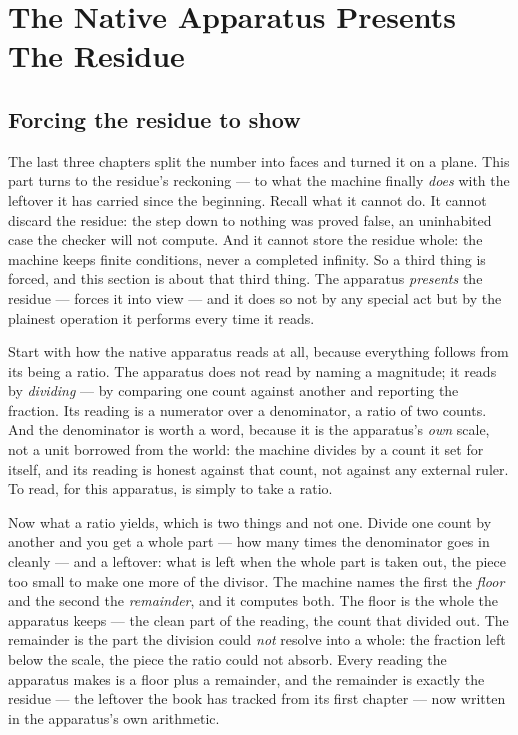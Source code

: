 \chapter{The Native Apparatus Presents The Residue}

\section{Forcing the residue to show}

The last three chapters split the number into faces and turned it on a plane. This part turns to the residue's
reckoning --- to what the machine finally \emph{does} with the leftover it has carried since the beginning. Recall what
it cannot do. It cannot discard the residue: the step down to nothing was proved false, an uninhabited case the checker
will not compute. And it cannot store the residue whole: the machine keeps finite conditions, never a completed
infinity. So a third thing is forced, and this section is about that third thing. The apparatus \emph{presents} the
residue --- forces it into view --- and it does so not by any special act but by the plainest operation it performs
every time it reads.

Start with how the native apparatus reads at all, because everything follows from its being a ratio. The apparatus
does not read by naming a magnitude; it reads by \emph{dividing} --- by comparing one count against another and
reporting the fraction. Its reading is a numerator over a denominator, a ratio of two counts. And the denominator is
worth a word, because it is the apparatus's \emph{own} scale, not a unit borrowed from the world: the machine divides
by a count it set for itself, and its reading is honest against that count, not against any external ruler. To read,
for this apparatus, is simply to take a ratio.

Now what a ratio yields, which is two things and not one. Divide one count by another and you get a whole part --- how
many times the denominator goes in cleanly --- and a leftover: what is left when the whole part is taken out, the piece
too small to make one more of the divisor. The machine names the first the \emph{floor} and the second the
\emph{remainder}, and it computes both. The floor is the whole the apparatus keeps --- the clean part of the reading,
the count that divided out. The remainder is the part the division could \emph{not} resolve into a whole: the fraction
left below the scale, the piece the ratio could not absorb. Every reading the apparatus makes is a floor plus a
remainder, and the remainder is exactly the residue --- the leftover the book has tracked from its first chapter ---
now written in the apparatus's own arithmetic.

